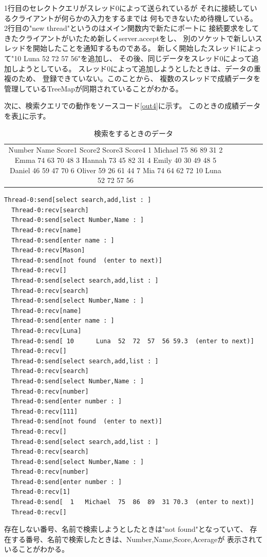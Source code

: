 \documentclass[dvipdfmx]{jsarticle}
\begin{document}
1行目のセレクトクエリがスレッド0によって送られているが
それに接続しているクライアントが何らかの入力をするまでは
何もできないため待機している。
2行目の"new thread"というのはメイン関数内で新たにポートに
接続要求をしてきたクライアントがいたため新しくserver.acceptをし、
別のソケットで新しいスレッドを開始したことを通知するものである。
新しく開始したスレッド1によって"10 Luna 52 72 57 56"を追加し、
その後、同じデータをスレッド0によって追加しようとしている。
スレッド0によって追加しようとしたときは、データの重複のため、
登録できていない。このことから、
複数のスレッドで成績データを管理しているTreeMapが同期されていることがわかる。

次に、検索クエリでの動作をソースコード\ref{out4}に示す。
このときの成績データを表\ref{data2}に示す。
\begin{table}[H]
  \begin{tabular}{cccccc}
    Number  Name  Score1  Score2  Score3  Score4
    1	Michael	75	86	89	31
    2	Emma	74	63	70	48
    3	Hannah	73	45	82	31
    4	Emily	40	30	49	48
    5	Daniel	46	59	47	70
    6	Oliver	59	26	61	44
    7	Mia	74	64	62	72
    10	Luna	52	72	57	56
  \end{tabular}
  \centering
  \caption{検索をするときのデータ}
  \label{data2}
\end{table}
\begin{lstlisting}[caption=検索クエリ,label=out4]
  Thread-0:send[select search,add,list : ]
  Thread-0:recv[search]
  Thread-0:send[select Number,Name : ]
  Thread-0:recv[name]
  Thread-0:send[enter name : ]
  Thread-0:recv[Mason]
  Thread-0:send[not found  (enter to next)]
  Thread-0:recv[]
  Thread-0:send[select search,add,list : ]
  Thread-0:recv[search]
  Thread-0:send[select Number,Name : ]
  Thread-0:recv[name]
  Thread-0:send[enter name : ]
  Thread-0:recv[Luna]
  Thread-0:send[ 10      Luna  52  72  57  56 59.3  (enter to next)]
  Thread-0:recv[]
  Thread-0:send[select search,add,list : ]
  Thread-0:recv[search]
  Thread-0:send[select Number,Name : ]
  Thread-0:recv[number]
  Thread-0:send[enter number : ]
  Thread-0:recv[111]
  Thread-0:send[not found  (enter to next)]
  Thread-0:recv[]
  Thread-0:send[select search,add,list : ]
  Thread-0:recv[search]
  Thread-0:send[select Number,Name : ]
  Thread-0:recv[number]
  Thread-0:send[enter number : ]
  Thread-0:recv[1]
  Thread-0:send[  1   Michael  75  86  89  31 70.3  (enter to next)]
  Thread-0:recv[]  
\end{lstlisting}

存在しない番号、名前で検索しようとしたときは"not found"となっていて、
存在する番号、名前で検索したときは、Number,Name,Score,Acerageが
表示されていることがわかる。
\end{document}
